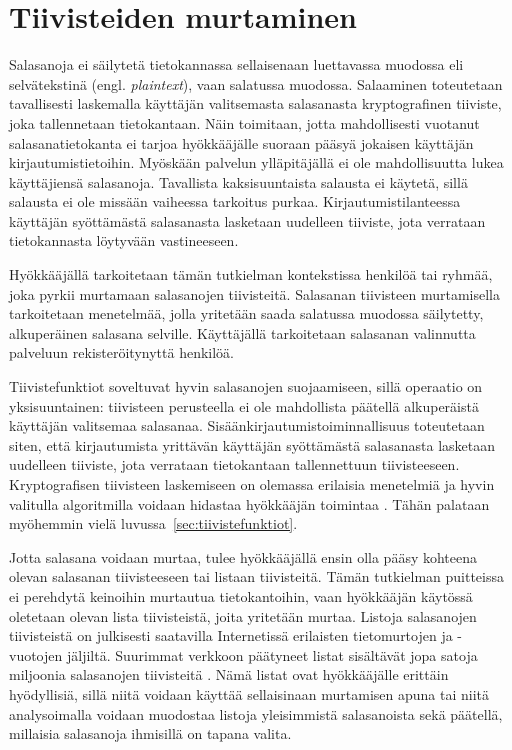 \chapter{Tiivisteiden murtaminen\label{ch:murtaminen}}

Salasanoja ei säilytetä tietokannassa sellaisenaan luettavassa muodossa eli selvätekstinä (engl. \textit{plaintext}), vaan salatussa muodossa. Salaaminen toteutetaan tavallisesti laskemalla käyttäjän valitsemasta salasanasta kryptografinen tiiviste, joka tallennetaan tietokantaan. Näin toimitaan, jotta mahdollisesti vuotanut salasanatietokanta ei tarjoa hyökkääjälle suoraan pääsyä jokaisen käyttäjän kirjautumistietoihin. Myöskään palvelun ylläpitäjällä ei ole mahdollisuutta lukea käyttäjiensä salasanoja. Tavallista kaksisuuntaista salausta ei käytetä, sillä salausta ei ole missään vaiheessa tarkoitus purkaa. Kirjautumistilanteessa käyttäjän syöttämästä salasanasta lasketaan uudelleen tiiviste, jota verrataan tietokannasta löytyvään vastineeseen.

Hyökkääjällä tarkoitetaan tämän tutkielman kontekstissa henkilöä tai ryhmää, joka pyrkii murtamaan salasanojen tiivisteitä. Salasanan tiivisteen murtamisella tarkoitetaan menetelmää, jolla yritetään saada salatussa muodossa säilytetty, alkuperäinen salasana selville. Käyttäjällä tarkoitetaan salasanan valinnutta palveluun rekisteröitynyttä henkilöä.

Tiivistefunktiot soveltuvat hyvin salasanojen suojaamiseen, sillä operaatio on yksisuuntainen: tiivisteen perusteella ei ole mahdollista päätellä alkuperäistä käyttäjän valitsemaa salasanaa. Sisäänkirjautumistoiminnallisuus toteutetaan siten, että kirjautumista yrittävän käyttäjän syöttämästä salasanasta lasketaan uudelleen tiiviste, jota verrataan tietokantaan tallennettuun tiivisteeseen. Kryptografisen tiivisteen laskemiseen on olemassa erilaisia menetelmiä ja hyvin valitulla algoritmilla voidaan hidastaa hyökkääjän toimintaa \citep{andersson_hashes_2023}. Tähän palataan myöhemmin vielä luvussa~\ref{sec:tiivistefunktiot}.

Jotta salasana voidaan murtaa, tulee hyökkääjällä ensin olla pääsy kohteena olevan salasanan tiivisteeseen tai listaan tiivisteitä. Tämän tutkielman puitteissa ei perehdytä keinoihin murtautua tietokantoihin, vaan hyökkääjän käytössä oletetaan olevan lista tiivisteistä, joita yritetään murtaa. Listoja salasanojen tiivisteistä on julkisesti saatavilla Internetissä erilaisten tietomurtojen ja -vuotojen jäljiltä. Suurimmat verkkoon päätyneet listat sisältävät jopa satoja miljoonia salasanojen tiivisteitä \citep{polychronakis_privacy_2017}. Nämä listat ovat hyökkääjälle erittäin hyödyllisiä, sillä niitä voidaan käyttää sellaisinaan murtamisen apuna tai niitä analysoimalla voidaan muodostaa listoja yleisimmistä salasanoista sekä päätellä, millaisia salasanoja ihmisillä on tapana valita.

